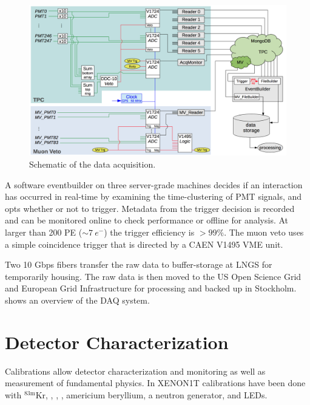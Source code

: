 \begin{figure}
\centering
\includegraphics[width=\textwidth]{DAQ}
\caption{Schematic of the data acquisition.}
\label{fig:xenon1t_daq_schematic}
\end{figure}

A software eventbuilder on three server-grade machines decides if an interaction has occurred in real-time by examining the
time-clustering of PMT signals, and opts whether or not to trigger.  Metadata from the trigger decision is recorded and can be monitored
online to check performance or offline for analysis.  At larger than 200 PE (${\sim}7\ e^-$) the trigger efficiency is $> 99\%$.  The muon
veto uses a simple coincidence trigger that is directed by a CAEN V1495 VME unit.

Two 10 Gbps fibers transfer the raw data to buffer-storage at LNGS for temporarily housing.  The raw data is then moved to the US Open
Science Grid and European Grid Infrastructure for processing and backed up in Stockholm.   shows an
overview of the DAQ system.



\section{Detector Characterization}
\label{sec:det_char}
Calibrations allow detector characterization and monitoring as well as measurement of fundamental physics.  In XENON1T calibrations have
been done with $\mathrm{^{83m}Kr}$, , , , americium beryllium, a neutron generator, and LEDs.


